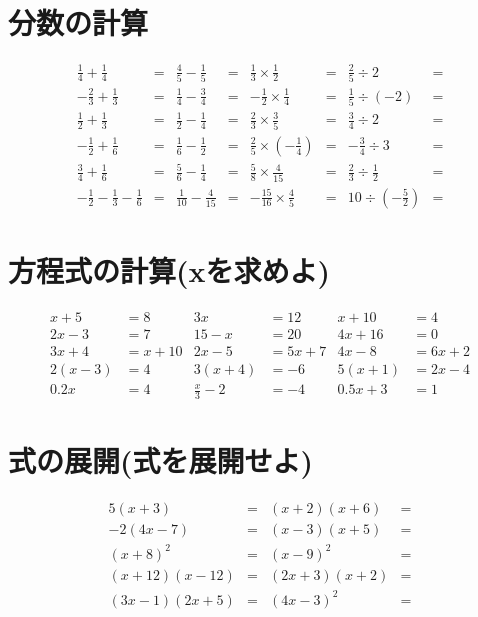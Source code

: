 \documentclass[paper=b4j,landscape,twocolumn,fleqn]{jlreq}
\begin{document}
\section{分数の計算}
\begin{align*}
    \frac{1}{4} + \frac{1}{4} &= & \frac{4}{5} - \frac{1}{5} &= & \frac{1}{3} \times \frac{1}{2} &= & \frac{2}{5} \div 2 &= \\
    -\frac{2}{3} + \frac{1}{3} &= & \frac{1}{4} - \frac{3}{4} &= & -\frac{1}{2} \times \frac{1}{4} &= & \frac{1}{5} \div (-2) &= \\
    \frac{1}{2} + \frac{1}{3} &= & \frac{1}{2} - \frac{1}{4} &= & \frac{2}{3} \times \frac{3}{5} &= & \frac{3}{4} \div 2 &= \\
    -\frac{1}{2} + \frac{1}{6} &= & \frac{1}{6} - \frac{1}{2} &= & \frac{2}{5} \times \left(-\frac{1}{4}\right) &= & -\frac{3}{4} \div 3 &= \\
    \frac{3}{4} + \frac{1}{6} &= & \frac{5}{6} - \frac{1}{4} &= & \frac{5}{8} \times \frac{4}{15} &= & \frac{2}{3} \div \frac{1}{2} &= \\
    -\frac{1}{2} - \frac{1}{3} - \frac{1}{6} &= & \frac{1}{10} - \frac{4}{15} &= & -\frac{15}{16} \times \frac{4}{5} &= & 10 \div \left(-\frac{5}{2}\right) &= 
\end{align*}

\newpage
\section{方程式の計算(xを求めよ)}
\begin{align*}
    x + 5 &= 8 & 3x &= 12 & x + 10 &= 4 \\
    2x - 3 &= 7 & 15 - x &= 20 & 4x + 16 &= 0 \\
    3x + 4 &= x + 10 & 2x - 5 &= 5x + 7 & 4x - 8 &= 6x + 2 \\
    2(x - 3) &= 4 & 3(x + 4) &= -6 & 5(x + 1) &= 2x - 4 \\
    0.2x &= 4 & \frac{x}{3} - 2 &= -4 & 0.5x + 3 &= 1 
\end{align*}
\section{式の展開(式を展開せよ)}
\begin{align*}
    5(x+3) &= & (x+2)(x+6) &= \\
    -2(4x-7) &= & (x-3)(x+5) &= \\
    (x+8)^2 &= & (x-9)^2 &= \\
    (x+12)(x-12) &= & (2x+3)(x+2) &= \\
    (3x-1)(2x+5) &= & (4x-3)^2 &= 
\end{align*}
\end{document}
